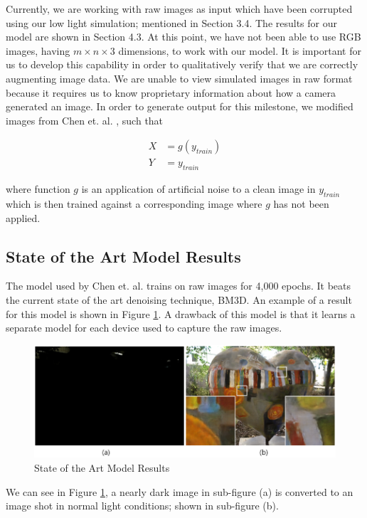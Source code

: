 \documentclass{article}
\begin{document}
Currently, we are working with raw images as input which have been corrupted
using our low light simulation; mentioned in Section 3.4. The results
for our model are shown in Section 4.3. At this point, we have not been
able to use RGB images, having $m \times n \times 3$ dimensions, to work
with our model. It is important for us to develop this
capability in order to qualitatively verify that we are correctly augmenting
image data. We are unable to view simulated images in raw format because
it requires us to know proprietary information about how a camera
generated an image. In order to generate output for this milestone, we
modified images from Chen et. al. \cite{chen2018learning}, such that

\begin{align*}
  X &= g(y_{train})\\
  Y &= y_{train}
\end{align*}

where function $g$ is an application of artificial noise to a clean
image in $y_{train}$ which is then trained against a corresponding
image where $g$ has not been applied.

\subsection{State of the Art Model Results}

The model used by Chen et. al. \cite{chen2018learning} trains on raw
images for 4,000 epochs. It beats the current state of the art denoising
technique, BM3D. An example of a result for this model is shown in
Figure \ref{fig:train}. A drawback of this model is that it learns a
separate model for each device used to capture the raw images.

\begin{figure}[ht]
  \centering
  \includegraphics[scale=0.35]{Their_results}
  \caption{ State of the Art Model Results}
  \label{fig:train}
\end{figure}

We can see in Figure \ref{fig:train}, a nearly dark image in sub-figure
(a) is converted to an image shot in normal light conditions; shown
in sub-figure (b).
\end{document}
